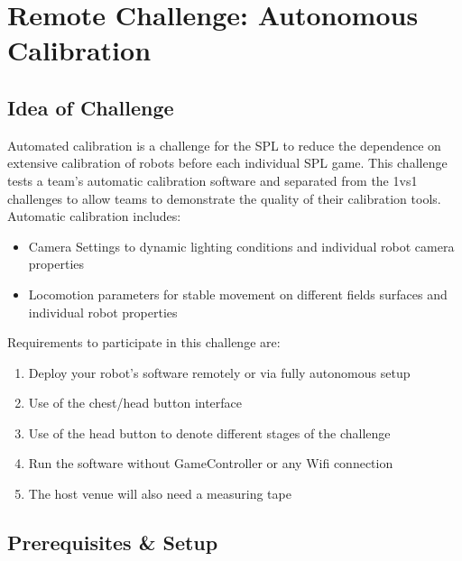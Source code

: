 \section{Remote Challenge: Autonomous Calibration}
\label{sec:AutonmousCalibration}

\subsection{Idea of Challenge}

Automated calibration is a challenge for the SPL to reduce the dependence on extensive calibration of robots before each individual SPL game.
This challenge tests a team's automatic calibration software and separated from the 1vs1 challenges to allow teams to demonstrate the quality of their calibration tools.
Automatic calibration includes:
\begin{itemize}
    \item Camera Settings to dynamic lighting conditions and individual robot camera properties
    \item Locomotion parameters for stable movement on different fields surfaces and individual robot properties
\end{itemize}

Requirements to participate in this challenge are:
\begin{enumerate}
    \item Deploy your robot's software remotely or via fully autonomous setup
    \item Use of the chest/head button interface
    \item Use of the head button to denote different stages of the challenge
    \item Run the software without GameController or any Wifi connection
    \item The host venue will also need a measuring tape
\end{enumerate}

\subsection{Prerequisites \& Setup}

